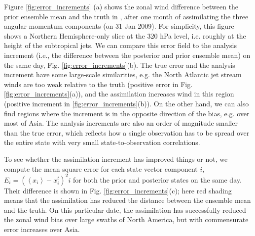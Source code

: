 Figure \ref{fig:error_increments} (a) shows the zonal wind difference between the prior ensemble mean and the truth in \ERPALL, after one month of assimilating the three angular momentum components (on 31 Jan 2009). 
For simplicity, this figure shows a Northern Hemisphere-only slice at the 320 hPa level, i.e. roughly at the height of the subtropical jets.
We can compare this error field to the analysis increment (i.e., the difference between the posterior and prior ensemble mean) on the same day, Fig. \ref{fig:error_increments}(b).
The true error and the analysis increment have some large-scale similarities, e.g. the North Atlantic jet stream winds are too weak relative to the truth (positive error in Fig.  \ref{fig:error_increments}(a)), and the assimilation increases wind in this region (positive increment in  \ref{fig:error_increments}(b)). 
On the other hand, we can also find regions where the increment is in the opposite direction of the bias, e.g. over most of Asia. 
The analysis increments are also an order of magnitude smaller than the true error, which reflects how a single observation has to be spread over the entire state with 
very small state-to-observation correlations.

To see whether the assimilation increment has improved things or not, we compute the mean square error for each state vector component $i$, $E_i = \left(\left< x_i \right>-x_{i}^{t}\right)^2i$ for both the prior and posterior states on the same day.
Their difference is shown in Fig. \ref{fig:error_increments}(c);  
here red shading means that the assimilation has reduced the distance between the ensemble mean and the truth.  
On this particular date, the assimilation has successfully reduced the zonal wind bias over large swaths of North America, but with commensurate error increases over Asia. 

